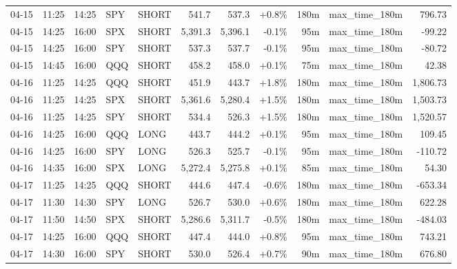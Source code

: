 \documentclass[11pt,a4paper,twoside]{article}
\begin{document}
\begin{center}
\begin{longtable}{>{\color{txtmain}}l l l l l r r r r >{\color{txtmain}}l r}
04-15 & 11:25 & 14:25 & SPY & SHORT & 541.7 & 537.3 & \textcolor{wingreen}{+0.8\%} & 180m & max\_time\_180m & \textcolor{wingreen}{796.73} \\
04-15 & 14:25 & 16:00 & SPX & SHORT & 5,391.3 & 5,396.1 & \textcolor{lossred}{-0.1\%} & 95m & max\_time\_180m & \textcolor{lossred}{-99.22} \\
04-15 & 14:25 & 16:00 & SPY & SHORT & 537.3 & 537.7 & \textcolor{lossred}{-0.1\%} & 95m & max\_time\_180m & \textcolor{lossred}{-80.72} \\
04-15 & 14:45 & 16:00 & QQQ & SHORT & 458.2 & 458.0 & \textcolor{wingreen}{+0.1\%} & 75m & max\_time\_180m & \textcolor{wingreen}{42.38} \\
04-16 & 11:25 & 14:25 & QQQ & SHORT & 451.9 & 443.7 & \textcolor{wingreen}{+1.8\%} & 180m & max\_time\_180m & \textcolor{wingreen}{1,806.73} \\
04-16 & 11:25 & 14:25 & SPX & SHORT & 5,361.6 & 5,280.4 & \textcolor{wingreen}{+1.5\%} & 180m & max\_time\_180m & \textcolor{wingreen}{1,503.73} \\
04-16 & 11:25 & 14:25 & SPY & SHORT & 534.4 & 526.3 & \textcolor{wingreen}{+1.5\%} & 180m & max\_time\_180m & \textcolor{wingreen}{1,520.57} \\
04-16 & 14:25 & 16:00 & QQQ & LONG & 443.7 & 444.2 & \textcolor{wingreen}{+0.1\%} & 95m & max\_time\_180m & \textcolor{wingreen}{109.45} \\
04-16 & 14:25 & 16:00 & SPY & LONG & 526.3 & 525.7 & \textcolor{lossred}{-0.1\%} & 95m & max\_time\_180m & \textcolor{lossred}{-110.72} \\
04-16 & 14:35 & 16:00 & SPX & LONG & 5,272.4 & 5,275.8 & \textcolor{wingreen}{+0.1\%} & 85m & max\_time\_180m & \textcolor{wingreen}{54.30} \\
04-17 & 11:25 & 14:25 & QQQ & SHORT & 444.6 & 447.4 & \textcolor{lossred}{-0.6\%} & 180m & max\_time\_180m & \textcolor{lossred}{-653.34} \\
04-17 & 11:30 & 14:30 & SPY & LONG & 526.7 & 530.0 & \textcolor{wingreen}{+0.6\%} & 180m & max\_time\_180m & \textcolor{wingreen}{622.28} \\
04-17 & 11:50 & 14:50 & SPX & SHORT & 5,286.6 & 5,311.7 & \textcolor{lossred}{-0.5\%} & 180m & max\_time\_180m & \textcolor{lossred}{-484.03} \\
04-17 & 14:25 & 16:00 & QQQ & SHORT & 447.4 & 444.0 & \textcolor{wingreen}{+0.8\%} & 95m & max\_time\_180m & \textcolor{wingreen}{743.21} \\
04-17 & 14:30 & 16:00 & SPY & SHORT & 530.0 & 526.4 & \textcolor{wingreen}{+0.7\%} & 90m & max\_time\_180m & \textcolor{wingreen}{676.80} \\

\end{longtable}
\end{center}
\end{document}
